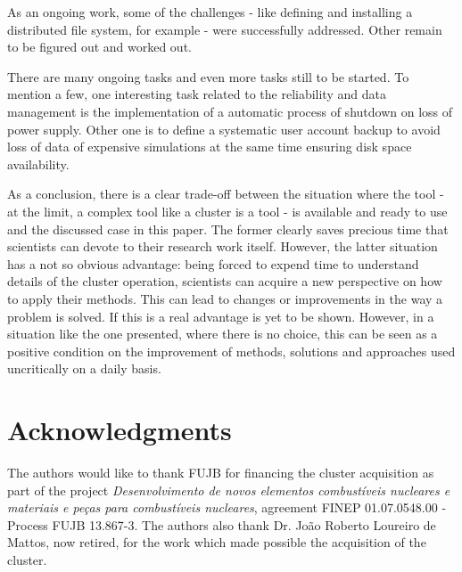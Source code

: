 \documentclass[twoside,a4paper,12pt,english]{inac19}
\begin{document}
As an ongoing work, some of the challenges - like defining and installing a distributed file system, for example - were successfully
addressed. Other remain to be figured out and worked out.

There are many ongoing tasks and even more tasks still to be started. To mention a few, one
interesting task related to the reliability and data management is the implementation of
a automatic process of shutdown on loss of power supply. Other one is to define a systematic
user account backup to avoid loss of data of expensive simulations at the same time ensuring
disk space availability.

As a conclusion, there is a clear trade-off between the situation where the tool - at the limit, a complex tool like a cluster is a tool - is available and ready to use and
the discussed case in this paper. The former clearly saves precious time that scientists can devote to their research work itself. However, the latter situation has a not so obvious
advantage: being forced to expend time to understand details of the cluster operation, scientists can acquire a new perspective on how to apply their
methods. This can lead to changes or improvements in the way a problem is solved. If this is a real advantage is yet to be shown. However,
in a situation like the one presented, where there is no choice, this can be seen as a positive condition on the improvement of methods, solutions and approaches used
uncritically on a daily basis.







\section*{Acknowledgments}
The authors would like to thank FUJB for financing the cluster acquisition
as part of the project \textit{Desenvolvimento de novos elementos combust\'{i}veis nucleares
  e materiais e pe\c{c}as para combust\'{i}veis nucleares}, agreement FINEP 01.07.0548.00 - Process FUJB 13.867-3.
The authors also thank Dr. Jo\~{a}o Roberto Loureiro de Mattos, now retired, for the work which made possible the acquisition of the cluster.

\end{document}
